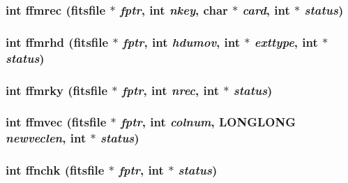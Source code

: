 \subsubsection{\setlength{\rightskip}{0pt plus 5cm}int ffmrec (\bf{fitsfile} $\ast$ {\em fptr}, int {\em nkey}, char $\ast$ {\em card}, int $\ast$ {\em status})}\label{test_2shm__client_2fitsio_8h_64f0b7aa1396fb5dc63502db966f8acd}


\subsubsection{\setlength{\rightskip}{0pt plus 5cm}int ffmrhd (\bf{fitsfile} $\ast$ {\em fptr}, int {\em hdumov}, int $\ast$ {\em exttype}, int $\ast$ {\em status})}\label{test_2shm__client_2fitsio_8h_d81f4e1c55fec210faa6343d3ed455ce}


\subsubsection{\setlength{\rightskip}{0pt plus 5cm}int ffmrky (\bf{fitsfile} $\ast$ {\em fptr}, int {\em nrec}, int $\ast$ {\em status})}\label{test_2shm__client_2fitsio_8h_d22c9244b2bef12cd893ff4e514f49fb}


\subsubsection{\setlength{\rightskip}{0pt plus 5cm}int ffmvec (\bf{fitsfile} $\ast$ {\em fptr}, int {\em colnum}, \bf{LONGLONG} {\em newveclen}, int $\ast$ {\em status})}\label{test_2shm__client_2fitsio_8h_4d65fa6c7cdfb529d91ceeed740985b3}


\subsubsection{\setlength{\rightskip}{0pt plus 5cm}int ffnchk (\bf{fitsfile} $\ast$ {\em fptr}, int $\ast$ {\em status})}\label{test_2shm__client_2fitsio_8h_3045d84f13f392c7d7600c5d734f4db7}


